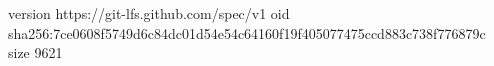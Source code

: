 version https://git-lfs.github.com/spec/v1
oid sha256:7ce0608f5749d6c84dc01d54e54c64160f19f405077475ccd883c738f776879c
size 9621
